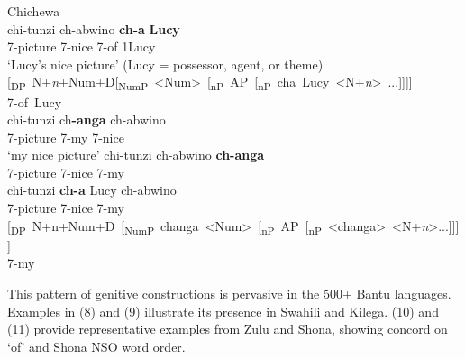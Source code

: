 \documentclass[output=paper
,modfonts
,nonflat]{langsci/langscibook}
\begin{document}
	\begin{exe}
		\ex  Chichewa \citep[372, 374]{Carstens1997}\\
		\xlist
		\ex
		\gll chi-tunzi     ch-abwino     \textbf{ch-a}   \textbf{Lucy}\\
		7-picture   7-nice         7-of   1Lucy\\
		\glt `Lucy's nice picture'  (Lucy = possessor, agent, or theme) 	
		\ex 
		\gll \mbox{[\textsubscript{DP} N+\textit{n}+Num+D[\textsubscript{NumP} <Num> [\textsubscript{nP} AP [\textsubscript{nP} cha Lucy <N+\textit{n}> ...]]]]}\\
		\mbox{\hspace{6.7cm}7-of Lucy}\\ 
		\ex {}
		\gll chi-tunzi     ch\textbf{-anga}     ch-abwino\\
		7-picture   7-my         7-nice\\
		\glt `my nice picture'
		\ex
		\gll  *chi-tunzi   ch-abwino     \textbf{ch-anga}\\
		7-picture   7-nice      7-my\\
		\ex
		\gll  *chi-tunzi   \textbf{ch-a} Lucy     ch-abwino\\
		7-picture   7-nice      7-my\\
		\ex 
		\gll\mbox{[\textsubscript{DP} N+n+Num+D [\textsubscript{NumP} changa <Num> [\textsubscript{nP} AP [\textsubscript{nP}  <changa> <N+\textit{n}>...]]]]}\\
		\hspace{3.9cm}7-my \\
		\endxlist
\end{exe}
This pattern of genitive constructions is pervasive in the 500+ Bantu languages. Examples in (8) and (9) illustrate its presence in Swahili and Kilega. (10) and (11) provide representative examples from Zulu and Shona, showing concord on ‘of’ and Shona NSO word order.
\end{document}
